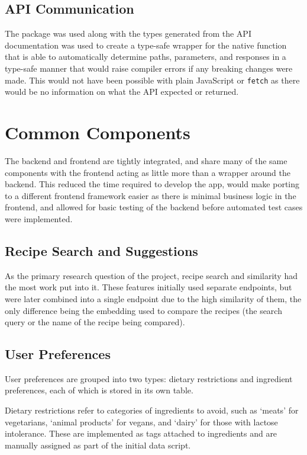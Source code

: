 \subsection{API Communication}
The  package was used along with the types generated from the API documentation was
used to create a type-safe wrapper for the native  function that is able to automatically
determine paths, parameters, and responses in a type-safe manner that would raise compiler errors if any breaking
changes were made. This would not have been possible with plain JavaScript or \texttt{fetch} as there would be no
information on what the API expected or returned.

\section{Common Components}

The backend and frontend are tightly integrated, and share many of the same components with the frontend acting
as little more than a wrapper around the backend. This reduced the time required to develop the app, would
make porting to a different frontend framework easier as there is minimal business logic in the frontend, and
allowed for basic testing of the backend before automated test cases were implemented.

\subsection{Recipe Search and Suggestions}
As the primary research question of the project, recipe search and similarity had the most work put into it.
These features initially used separate endpoints, but were later combined into a single endpoint due to the
high similarity of them, the only difference being the embedding used to compare the recipes (the search query
or the name of the recipe being compared).

\subsection{User Preferences}
User preferences are grouped into two types: dietary restrictions and ingredient preferences, each of which is stored
in its own table.

Dietary restrictions refer to categories of ingredients to avoid, such as \enquote*{meats} for vegetarians,
\enquote*{animal products} for vegans, and \enquote*{dairy} for those with lactose intolerance. These are implemented
as tags attached to ingredients and are manually assigned as part of the initial data script.

